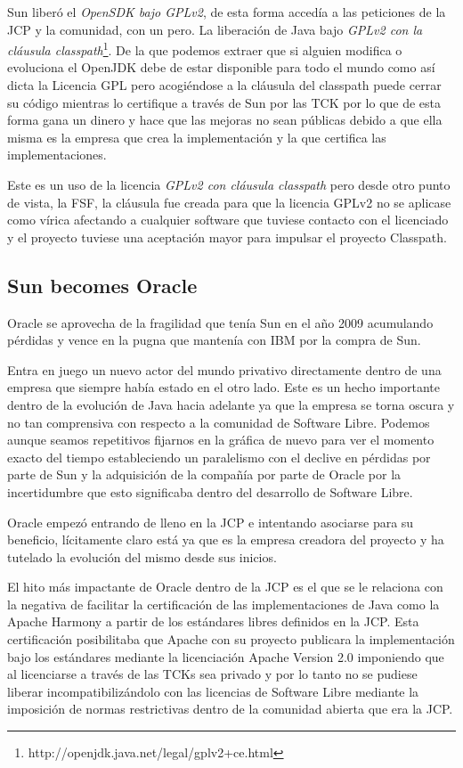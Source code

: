 \documentclass[11pt]{scrartcl}
\begin{document}
Sun liberó el \emph{OpenSDK bajo GPLv2}, de esta forma accedía a las peticiones de la JCP y la comunidad, con un pero. La liberación de Java bajo \emph{GPLv2 con la cláusula classpath}\footnote{http://openjdk.java.net/legal/gplv2+ce.html}. De la que podemos extraer que si alguien modifica o evoluciona el OpenJDK debe de estar disponible para todo el mundo como así dicta la Licencia GPL pero acogiéndose a la cláusula del classpath puede cerrar su código mientras lo certifique a través de Sun por las TCK por lo que de esta forma gana un dinero y hace que las mejoras no sean públicas debido a que ella misma es la empresa que crea la implementación y la que certifica las implementaciones.

Este es un uso de la licencia \emph{GPLv2 con cláusula classpath} pero desde otro punto de vista, la FSF, la cláusula fue creada para que la licencia GPLv2 no se aplicase como vírica afectando a cualquier software que tuviese contacto con el licenciado y el proyecto tuviese una aceptación mayor para impulsar el proyecto Classpath.

\subsection{Sun becomes Oracle}

Oracle se aprovecha de la fragilidad que tenía Sun en el año 2009 acumulando pérdidas y vence en la pugna que mantenía con IBM por la compra de Sun.

Entra en juego un nuevo actor del mundo privativo directamente dentro de una empresa que siempre había estado en el otro lado. Este es un hecho importante dentro de la evolución de Java hacia adelante ya que la empresa se torna oscura y no tan comprensiva con respecto a la comunidad de Software Libre. Podemos aunque seamos repetitivos fijarnos en la gráfica de nuevo para ver el momento exacto del tiempo estableciendo un paralelismo con el declive en pérdidas por parte de Sun y la adquisición de la compañía por parte de Oracle por la incertidumbre que esto significaba dentro del desarrollo de Software Libre.

Oracle empezó entrando de lleno en la JCP e intentando asociarse para su beneficio, lícitamente claro está ya que es la empresa creadora del proyecto y ha tutelado la evolución del mismo desde sus inicios.

El hito más impactante de Oracle dentro de la JCP es el que se le relaciona con la negativa de facilitar la certificación de las implementaciones de Java como la Apache Harmony a partir de los estándares libres definidos en la JCP. Esta certificación posibilitaba que Apache con su proyecto publicara la implementación bajo los estándares mediante la licenciación Apache Version 2.0 imponiendo que al licenciarse a través de las TCKs sea privado y por lo tanto no se pudiese liberar incompatibilizándolo con las licencias de Software Libre mediante la imposición de normas restrictivas dentro de la comunidad abierta que era la JCP.
\end{document}
